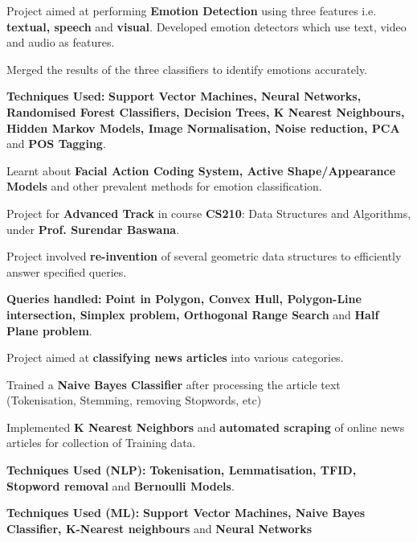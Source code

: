 \documentclass[a4paper]{norm-resume}
\begin{document}
	\vspace{2mm}
	
	   
	\begin{tightitemize}
	\small
	{
	\item Project aimed at performing \textbf{Emotion Detection} using three features i.e. \textbf{textual, speech} and \textbf{visual}. Developed emotion detectors which use text, video and audio as features.
	\item Merged the results of the three classifiers to identify emotions accurately.
	\item \textbf{Techniques Used:} \textbf{Support Vector Machines, Neural Networks, Randomised Forest Classifiers, Decision Trees, K Nearest Neighbours, Hidden Markov Models, Image Normalisation, Noise reduction, PCA} and \textbf{POS Tagging}.
	\item Learnt about \textbf{Facial Action Coding System,
Active Shape/Appearance Models} and other prevalent methods for emotion classification.
	}
	\end{tightitemize}
		
	\vspace{2mm}
	
	   \descript{Sep '14 - Nov '14}
	\begin{tightitemize}
	\small
	{
	\item Project for \textbf{Advanced Track} in course \textbf{CS210}: Data Structures and Algorithms, under \textbf{Prof. Surendar Baswana}.
	\item Project involved \textbf{re-invention} of several geometric data structures to efficiently answer specified queries.	
	\item \textbf{Queries handled:} \textbf{Point in Polygon, Convex Hull, Polygon-Line intersection, Simplex problem, Orthogonal Range Search} and \textbf{Half Plane problem}.
	}
	\end{tightitemize}
 		
	\vspace{2mm}
		
	   \descript{Jan '14 - Apr '14}
	\begin{tightitemize}
	\small
	{
	\item Project aimed at \textbf{classifying news articles} into various categories.
	\item Trained a \textbf{Naive Bayes Classifier} after processing the article text (Tokenisation, Stemming, removing Stopwords, etc)
	\item Implemented \textbf{K Nearest Neighbors} and \textbf{automated scraping} of online news articles for collection of Training data.
	\item \textbf{Techniques Used (NLP):} \textbf{Tokenisation, Lemmatisation, TFID, Stopword removal} and \textbf{Bernoulli Models}.
	\item \textbf{Techniques Used (ML):} \textbf{Support Vector Machines, Naive Bayes Classifier, K-Nearest neighbours} and \textbf{Neural Networks}
	}
	\end{tightitemize}
 		
\end{document}
